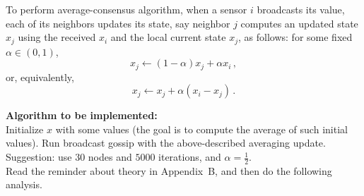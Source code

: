 \documentclass{article}
\begin{document}
To perform average-consensus algorithm, when a sensor $i$ broadcasts its value, each of its neighbors updates its state, say neighbor $j$ computes an updated state $x_j$ using the received $x_i$ and the local current state $x_j$, as follows:
 for some fixed $\alpha \in (0,1)$,
\[ x_j  \leftarrow (1- \alpha) x_j + \alpha x_i \,,\]
 or, equivalently,
\[ x_j \leftarrow x_j + \alpha (x_i-x_j) \,.\]

\textbf{Algorithm to be implemented:}\\
Initialize $x$ with some values (the goal is to compute the average of such initial values).
Run broadcast gossip with the above-described averaging update.\\
Suggestion: use $30$ nodes and $5000$ iterations, and $\alpha = \frac{1}{2}$.\\

Read the reminder about theory in Appendix~B, and then do the following analysis.\\
\end{document}
